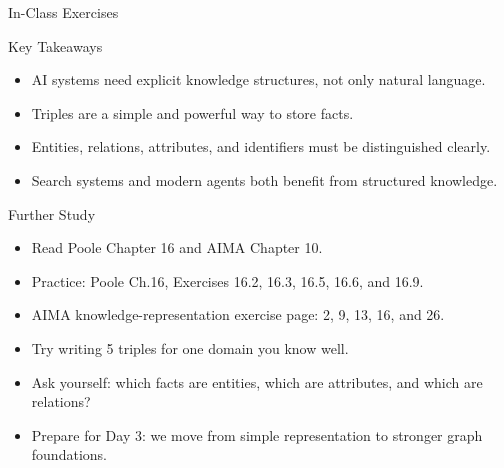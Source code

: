 \documentclass[aspectratio=169]{beamer}
\newcommand{\defaultdeckrefs}{AIMA4e Ch.10 pp.314--343; Poole3e Ch.16 pp.701--730}
\newcommand{\currentsliderefs}{\defaultdeckrefs}
\newcommand{\setslideref}[1]{\gdef\currentsliderefs{#1}}
\begin{document}
\setslideref{AIMA4e Ch.10 pp.314--343; Poole3e Ch.16 pp.701--730}
\begin{frame}{In-Class Exercises}
\end{frame}

\setslideref{AIMA4e Ch.10 pp.314--343; Poole3e Ch.16 pp.701--730}
\begin{frame}{Key Takeaways}
\begin{itemize}
  \item AI systems need explicit knowledge structures, not only natural language.
  \item Triples are a simple and powerful way to store facts.
  \item Entities, relations, attributes, and identifiers must be distinguished clearly.
  \item Search systems and modern agents both benefit from structured knowledge.
\end{itemize}
\end{frame}

\setslideref{AIMA4e Ch.10 pp.314--343; Poole3e Ch.16 pp.701--730}
\begin{frame}{Further Study}
\begin{itemize}
  \item Read Poole Chapter 16 and AIMA Chapter 10.
  \item Practice: Poole Ch.16, Exercises 16.2, 16.3, 16.5, 16.6, and 16.9.
  \item AIMA knowledge-representation exercise page: 2, 9, 13, 16, and 26.
  \item Try writing 5 triples for one domain you know well.
  \item Ask yourself: which facts are entities, which are attributes, and which are relations?
  \item Prepare for Day 3: we move from simple representation to stronger graph foundations.
\end{itemize}
\end{frame}
\end{document}
